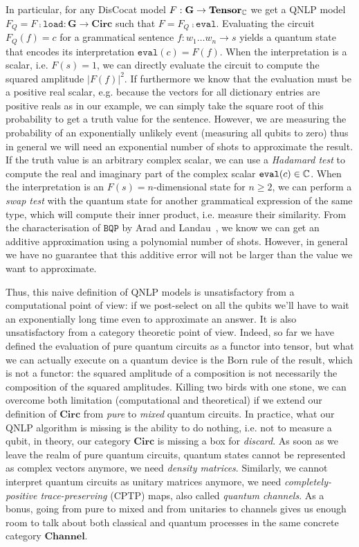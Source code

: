 In particular, for any DisCocat model $F : \mathbf{G} \to \mathbf{Tensor}_{\mathbb{C}}$ we get a QNLP model $F_Q = F \fcmp \mathtt{load} : \mathbf{G} \to \mathbf{Circ}$ such that $F = F_Q \fcmp \mathtt{eval}$.
Evaluating the circuit $F_Q(f) = c$ for a grammatical sentence $f : w_1 \dots w_n \to s$ yields a quantum state that encodes its interpretation $\mathtt{eval}(c) = F(f)$.
When the interpretation is a scalar, i.e. $F(s) = 1$, we can directly evaluate the circuit to compute the squared amplitude $\vert F(f) \vert^2$.
If furthermore we know that the evaluation must be a positive real scalar, e.g. because the vectors for all dictionary entries are positive reals as in our example, we can simply take the square root of this probability to get a truth value for the sentence.
However, we are measuring the probability of an exponentially unlikely event (measuring all qubits to zero) thus in general we will need an exponential number of shots to approximate the result.
If the truth value is an arbitrary complex scalar, we can use a \emph{Hadamard test} to compute the real and imaginary part of the complex scalar $\mathtt{eval}(c) \in \mathbb{C}$.
When the interpretation is an $F(s) = n$-dimensional state for $n \geq 2$, we can perform a \emph{swap test} with the quantum state for another grammatical expression of the same type, which will compute their inner product, i.e. measure their similarity.
From the characterisation of $\mathtt{BQP}$ by Arad and Landau~\cite{AradLandau10}, we know we can get an additive approximation using a polynomial number of shots.
However, in general we have no guarantee that this additive error will not be larger than the value we want to approximate.

Thus, this naive definition of QNLP models is unsatisfactory from a computational point of view: if we post-select on all the qubits we'll have to wait an exponentially long time even to approximate an answer.
It is also unsatisfactory from a category theoretic point of view.
Indeed, so far we have defined the evaluation of pure quantum circuits as a functor into tensor, but what we can actually execute on a quantum device is the Born rule of the result, which is not a functor: the squared amplitude of a composition is not necessarily the composition of the squared amplitudes.
Killing two birds with one stone, we can overcome both limitation (computational and theoretical) if we extend our definition of $\mathbf{Circ}$ from \emph{pure} to \emph{mixed} quantum circuits.
In practice, what our QNLP algorithm is missing is the ability to do nothing, i.e. not to measure a qubit, in theory, our category $\mathbf{Circ}$ is missing a box for \emph{discard}.
As soon as we leave the realm of pure quantum circuits, quantum states cannot be represented as complex vectors anymore, we need \emph{density matrices}.
Similarly, we cannot interpret quantum circuits as unitary matrices anymore, we need \emph{completely-positive trace-preserving} (CPTP) maps, also called \emph{quantum channels}.
As a bonus, going from pure to mixed and from unitaries to channels gives us enough room to talk about both classical and quantum processes in the same concrete category $\mathbf{Channel}$.
